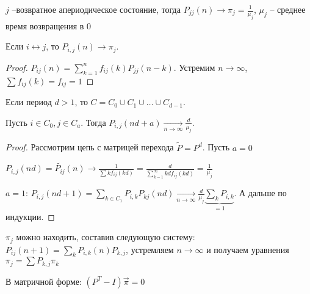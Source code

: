 \begin{theorem}

$j$ --возвратное апериодическое состояние, тогда $P_{jj}(n) \to \pi_j = \frac{1}{\mu_j}$, $\mu_j$ -- среднее время возвращения в 0
\end{theorem}
\begin{conseq}
Если $i \leftrightarrow j$, то $P_{i,j}(n) \to \pi_j$.
\end{conseq}
\begin{proof}
$P_{ij}(n) = \sum\limits_{k=1}^n f_{ij}(k) P_{jj}(n - k)$. Устремим $n \to \infty$, $\sum f_{ij}(k) = f_{ij} = 1$
\end{proof}
\begin{conseq}
Если период $d > 1$, то $C = C_0 \cup C_1 \cup \dots \cup C_{d-1}$.

Пусть $i \in C_0, j \in C_a$. Тогда $P_{i,j}(nd+a) \xrightarrow[n \to \infty]{} \frac{d}{\mu_j}$.

\end{conseq}
\begin{proof}
Рассмотрим цепь с матрицей перехода $\widetilde{P} = P^d$. Пусть $a = 0$


$P_{i,j}(nd) = \widetilde{P_{ij}}(n) \to \frac{1}{\sum k f_{ij}(kd)} = \frac{d}{\sum\limits_{k-1}^\infty kd f_{ij}(kd)} = \frac{1}{\mu_j}$

$a = 1$: $P_{i,j}(nd + 1) = \sum\limits_{k \in C_1} P_{i,k} P_{kj}(nd) \xrightarrow[n \to \infty]{} \frac{d}{\mu_j} \underbrace{\sum\limits_k P_{i, k}}_{=1}$. 
А дальше по индукции.
\end{proof}
\begin{Rem}
$\pi_j$ можно находить, составив следующую систему:
$P_{ij}(n + 1) = \sum\limits_k P_{i, k}(n) P_{k, j}$, устремляем $n \to \infty$ и получаем уравнения $\pi_j = \sum P_{k, j} \pi_k$

В матричной форме: $(P^T - I) \overrightarrow{\pi} = 0$
\end{Rem}

